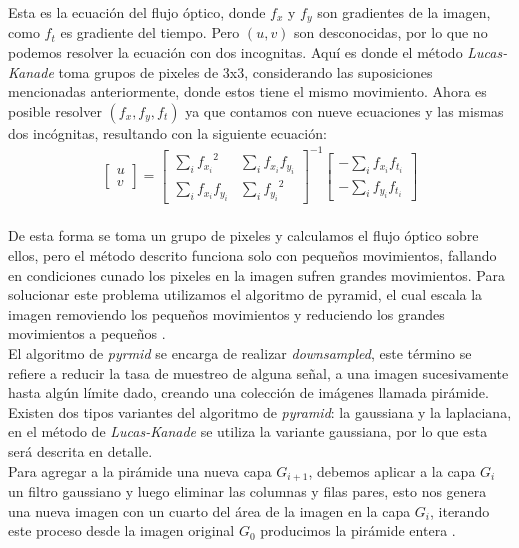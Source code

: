 \documentclass{iccmemoria}
\begin{document}
Esta es la ecuación del flujo óptico, donde $f_x$ y $f_y$ son gradientes de la imagen, como $f_t$ es gradiente del tiempo. Pero $(u, v)$ son desconocidas, por lo que no podemos resolver la ecuación con dos incognitas. Aquí es donde el método \emph{Lucas-Kanade} toma grupos de pixeles de 3x3, considerando las suposiciones mencionadas anteriormente, donde estos tiene el mismo movimiento. Ahora es posible resolver $(f_x, f_y, f_t)$ ya que contamos con nueve ecuaciones y las mismas dos incógnitas, resultando con la siguiente ecuación:\\

\begin{equation}
	\begin{split}
		\begin{bmatrix} u \\ v \end{bmatrix} = \begin{bmatrix} \sum_{i}{f_{x_i}}^2 & \sum_{i}{f_{x_i} f_{y_i} } \\ \sum_{i}{f_{x_i} f_{y_i}} & \sum_{i}{f_{y_i}}^2 \end{bmatrix}^{-1} \begin{bmatrix} - \sum_{i}{f_{x_i} f_{t_i}} \\ - \sum_{i}{f_{y_i} f_{t_i}} \end{bmatrix}
	\end{split}
\end{equation}\\

De esta forma se toma un grupo de pixeles y calculamos el flujo óptico sobre ellos, pero el método descrito funciona solo con pequeños movimientos, fallando en condiciones cunado los pixeles en la imagen sufren grandes movimientos. Para solucionar este problema utilizamos el algoritmo de pyramid, el cual escala la imagen removiendo los pequeños movimientos y reduciendo los grandes movimientos a pequeños \cite{OpenCV}.\\

El algoritmo de \emph{pyrmid} se encarga de realizar \emph{downsampled}, este término se refiere a reducir la tasa de muestreo de alguna señal, a una imagen sucesivamente hasta algún límite dado, creando una colección de imágenes llamada pirámide. Existen dos tipos variantes del algoritmo de \emph{pyramid}: la gaussiana y la laplaciana, en el método de \emph{Lucas-Kanade} se utiliza la variante gaussiana, por lo que esta será descrita en detalle.\\

Para agregar a la pirámide una nueva capa $G_{i+1}$, debemos aplicar a la capa $G_i$ un filtro gaussiano y luego eliminar las columnas y filas pares, esto nos genera una nueva imagen con un cuarto del área de la imagen en la capa $G_i$, iterando este proceso desde la imagen original $G_0$ producimos la pirámide entera \cite{bradski2008learning}.\\
\end{document}
